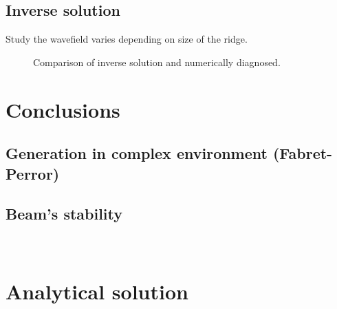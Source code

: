 \subsection{Inverse solution}
Study the wavefield varies depending on size of the ridge.
\begin{figure}
\caption{Comparison of inverse solution and numerically diagnosed.}
\end{figure}

\section{Conclusions}
\subsection{Generation in complex environment (Fabret-Perror)}
\subsection{Beam's stability}



\newpage

\appendix

\section{\\Analytical solution}

